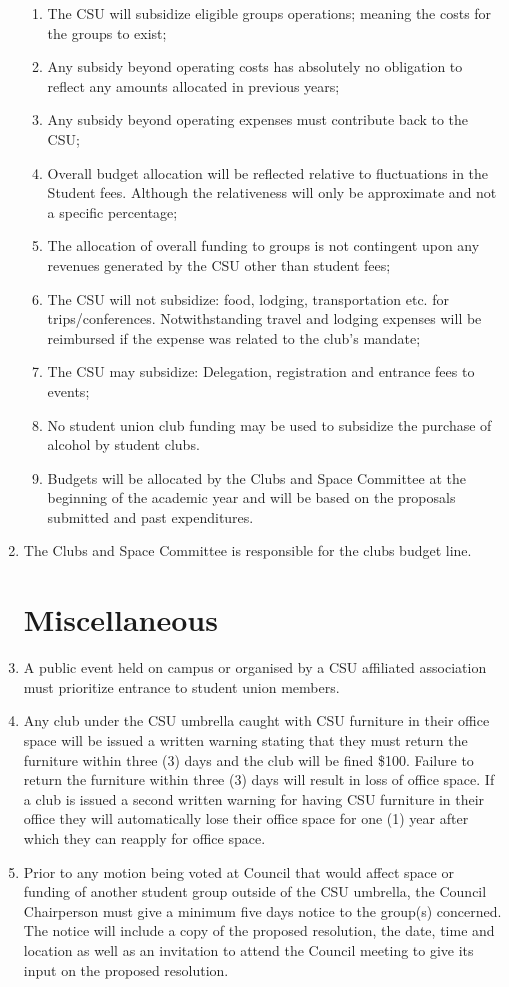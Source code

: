 \documentclass[oneside]{book}
\begin{document}
\begin{enumerate}
\begin{enumerate}
\item The CSU will subsidize eligible groups operations; meaning the costs
for the groups to exist; 
\item Any subsidy beyond operating costs has absolutely no obligation to
reflect any amounts allocated in previous years; 
\item Any subsidy beyond operating expenses must contribute back to the
CSU; 
\item Overall budget allocation will be reflected relative to fluctuations
in the Student fees. Although the relativeness will only be approximate
and not a specific percentage; 
\item The allocation of overall funding to groups is not contingent upon
any revenues generated by the CSU other than student fees; 
\item The CSU will not subsidize: food, lodging, transportation etc. for
trips/conferences. Notwithstanding travel and lodging expenses will
be reimbursed if the expense was related to the club's mandate; 
\item The CSU may subsidize: Delegation, registration and entrance fees
to events; 
\item No student union club funding may be used to subsidize the purchase
of alcohol by student clubs. 
\item Budgets will be allocated by the Clubs and Space Committee at the
beginning of the academic year and will be based on the proposals
submitted and past expenditures. 
\end{enumerate}
\item The Clubs and Space Committee is responsible for the clubs budget
line. 

\section{\label{Miscellaneous}Miscellaneous }
\item A public event held on campus or organised by a CSU affiliated association
must prioritize entrance to student union members. 
\item Any club under the CSU umbrella caught with CSU furniture in their
office space will be issued a written warning stating that they must
return the furniture within three (3) days and the club will be fined
\$100. Failure to return the furniture within three (3) days will
result in loss of office space. If a club is issued a second written
warning for having CSU furniture in their office they will automatically
lose their office space for one (1) year after which they can reapply
for office space. 
\item Prior to any motion being voted at Council that would affect space
or funding of another student group outside of the CSU umbrella, the
Council Chairperson must give a minimum five days notice to the group(s)
concerned. The notice will include a copy of the proposed resolution,
the date, time and location as well as an invitation to attend the
Council meeting to give its input on the proposed resolution. 


\end{enumerate}
\end{document}
